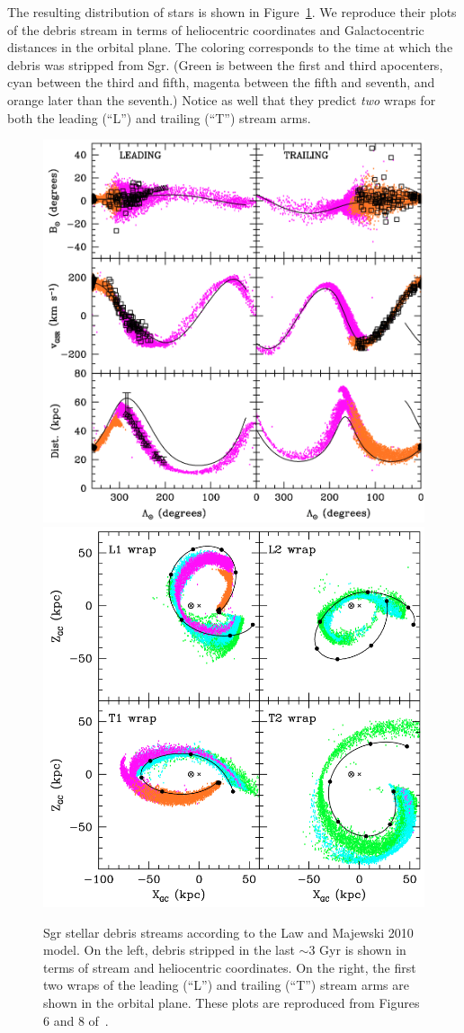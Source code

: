 The resulting distribution of stars is shown in Figure~\ref{fig:law}. We
reproduce their plots of the debris stream in terms of heliocentric
coordinates and Galactocentric distances in the orbital plane. The coloring
corresponds to the time at which the debris was stripped from Sgr. (Green is
between the first and third apocenters, cyan between the third and fifth,
magenta between the fifth and seventh, and orange later than the seventh.)
Notice as well that they predict \textit{two} wraps for both the leading
(``L'') and trailing (``T'') stream arms.

\begin{figure}
    \centering 
    \includegraphics[width=0.45\linewidth]{figs/law2010-6.png}
    \includegraphics[width=0.45\linewidth]{figs/law2010-8.png}
    \caption{%
        Sgr stellar debris streams according to the Law and Majewski 2010
        model. On the left, debris stripped in the last $\sim 3$ Gyr is shown
        in terms of stream and heliocentric coordinates. On the right, the
        first two wraps of the leading (``L'') and trailing (``T'') stream
        arms are shown in the orbital plane. These plots are reproduced from
        Figures 6 and 8 of~\cite{law_sagittarius_2010}.
    }
    \label{fig:law}
\end{figure}

